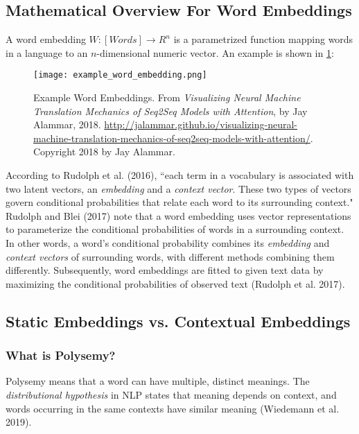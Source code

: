 \subsection{Mathematical Overview For Word Embeddings}
 
A word embedding $W: [Words] \rightarrow R^n$ is a parametrized function mapping words in a language to an $n$-dimensional numeric vector. An example is shown in \cref{fig:exampleWordEmb}:

\begin{figure}[h]
\vspace{-10pt}
\centering
\texttt{[image: example\_word\_embedding.png]}
\vspace{-10pt}
\caption{\footnotesize Example Word Embeddings. From \emph{Visualizing Neural Machine Translation Mechanics of Seq2Seq Models with Attention}, by Jay Alammar, 2018. \url{http://jalammar.github.io/visualizing-neural-machine-translation-mechanics-of-seq2seq-models-with-attention/}. Copyright 2018 by Jay Alammar.}
\vspace{-10pt}
\label{fig:exampleWordEmb}
\end{figure}

According to Rudolph et al. (2016), ``each term in a vocabulary is associated with two latent vectors, an \emph{embedding} and a \emph{context vector}. These two types of vectors govern conditional probabilities that relate each word to its surrounding context." 
Rudolph and Blei (2017) note that a word embedding uses vector representations to parameterize the conditional probabilities of words in a surrounding context. 
In other words, a word's conditional probability combines its \emph{embedding} and \emph{context vectors} of surrounding words, with different methods combining them differently. Subsequently, word embeddings are fitted to given text data by maximizing the conditional probabilities of observed text (Rudolph et al. 2017). 

\subsection{Static Embeddings vs. Contextual Embeddings} \label{sec:StaticVsContextualEmb}

\subsubsection{What is Polysemy?} \label{sec:Polysemy}

Polysemy means that a word can have multiple, distinct meanings. The \emph{distributional hypothesis} in NLP states that meaning depends on context, and words occurring in the same contexts have similar meaning (Wiedemann et al. 2019). 

